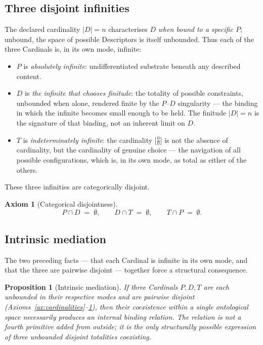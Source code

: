\documentclass[11pt,a4paper]{article}
\newtheorem{proposition}[theorem]{Proposition}
\theoremstyle{definition}
\newtheorem{axiom}[theorem]{Axiom}
\theoremstyle{remark}
\begin{document}
\subsection{Three disjoint infinities}\label{subsec:three-infinities}

The declared cardinality $|D|=n$ characterises $D$ \emph{when bound to a specific $P$}; unbound, the space of possible Descriptors is itself unbounded. Thus each of the three Cardinals is, in its own mode, infinite:
\begin{itemize}[leftmargin=*]
\item $P$ is \emph{absolutely infinite}: undifferentiated substrate beneath any described content.
\item $D$ is \emph{the infinite that chooses finitude}: the totality of possible constraints, unbounded when alone, rendered finite by the $P$--$D$ singularity --- the binding in which the infinite becomes small enough to be held. The finitude $|D|=n$ is the signature of that binding, not an inherent limit on $D$.
\item $T$ is \emph{indeterminately infinite}: the cardinality $\bigl[\tfrac{0}{0}\bigr]$ is not the absence of cardinality, but the cardinality of genuine choice --- the navigation of all possible configurations, which is, in its own mode, as total as either of the others.
\end{itemize}

These three infinities are categorically disjoint.

\begin{axiom}[Categorical disjointness]\label{ax:disjoint}
\[
P \cap D \;=\; \emptyset, \qquad D \cap T \;=\; \emptyset, \qquad T \cap P \;=\; \emptyset.
\]
\end{axiom}

\subsection{Intrinsic mediation}

The two preceding facts --- that each Cardinal is infinite in its own mode, and that the three are pairwise disjoint --- together force a structural consequence.

\begin{proposition}[Intrinsic mediation]\label{prop:intrinsic}
If three Cardinals $P,D,T$ are each unbounded in their respective modes and are pairwise disjoint (Axioms~\ref{ax:cardinalities}--\ref{ax:disjoint}), then their coexistence within a single ontological space necessarily produces an internal binding relation. The relation is not a fourth primitive added from outside; it is the only structurally possible expression of three unbounded disjoint totalities coexisting.
\end{proposition}
\end{document}
